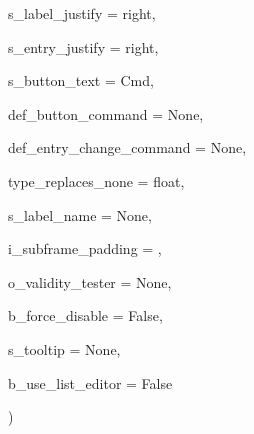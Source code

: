 {\begin{DoxyParamCaption}
\item[{}]{s\+\_\+label\+\_\+justify = {\ttfamily \textquotesingle{}right\textquotesingle{}}, }
\item[{}]{s\+\_\+entry\+\_\+justify = {\ttfamily \textquotesingle{}right\textquotesingle{}}, }
\item[{}]{s\+\_\+button\+\_\+text = {\ttfamily \textquotesingle{}Cmd\textquotesingle{}}, }
\item[{}]{def\+\_\+button\+\_\+command = {\ttfamily None}, }
\item[{}]{def\+\_\+entry\+\_\+change\+\_\+command = {\ttfamily None}, }
\item[{}]{type\+\_\+replaces\+\_\+none = {\ttfamily float}, }
\item[{}]{s\+\_\+label\+\_\+name = {\ttfamily None}, }
\item[{}]{i\+\_\+subframe\+\_\+padding = {}, }
\item[{}]{o\+\_\+validity\+\_\+tester = {\ttfamily None}, }
\item[{}]{b\+\_\+force\+\_\+disable = {\ttfamily False}, }
\item[{}]{s\+\_\+tooltip = {\ttfamily None}, }
\item[{}]{b\+\_\+use\+\_\+list\+\_\+editor = {\ttfamily False}}
\end{DoxyParamCaption}
)}\hypertarget{classnegui_1_1pgguiutilities_1_1KeyValFrame_a9d507011f4523f708351c682b788f3e5}{}\label{classnegui_1_1pgguiutilities_1_1KeyValFrame_a9d507011f4523f708351c682b788f3e5}
